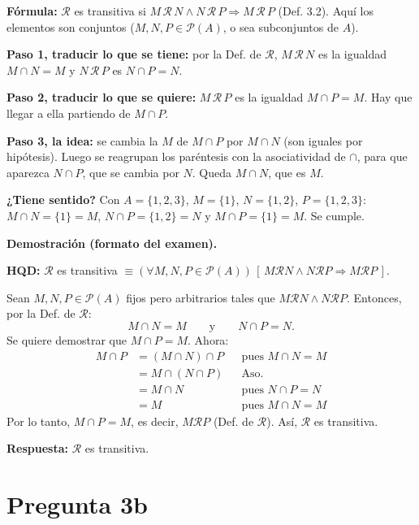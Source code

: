 \documentclass[11pt]{article}
\newcommand{\R}{\mathcal{R}}
\begin{document}

\begin{explica}
\textbf{Fórmula:} $\R$ es transitiva si $M\,\R\,N\wedge N\,\R\,P\Rightarrow M\,\R\,P$ (Def. 3.2). Aquí los elementos son conjuntos ($M,N,P\in\mathcal P(A)$, o sea subconjuntos de $A$).

\textbf{Paso 1, traducir lo que se tiene:} por la Def. de $\R$, $M\,\R\,N$ es la igualdad $M\cap N=M$ y $N\,\R\,P$ es $N\cap P=N$.

\textbf{Paso 2, traducir lo que se quiere:} $M\,\R\,P$ es la igualdad $M\cap P=M$. Hay que llegar a ella partiendo de $M\cap P$.

\textbf{Paso 3, la idea:} se cambia la $M$ de $M\cap P$ por $M\cap N$ (son iguales por hipótesis). Luego se reagrupan los paréntesis con la asociatividad de $\cap$, para que aparezca $N\cap P$, que se cambia por $N$. Queda $M\cap N$, que es $M$.

\textbf{¿Tiene sentido?} Con $A=\{1,2,3\}$, $M=\{1\}$, $N=\{1,2\}$, $P=\{1,2,3\}$: $M\cap N=\{1\}=M$, $N\cap P=\{1,2\}=N$ y $M\cap P=\{1\}=M$. Se cumple.
\end{explica}

\textbf{Demostración (formato del examen).}

\textbf{HQD:} $\R$ es transitiva $\equiv(\forall M,N,P\in\mathcal P(A))\,[\,M\R N\wedge N\R P\Rightarrow M\R P\,]$.

Sean $M,N,P\in\mathcal P(A)$ fijos pero arbitrarios tales que $M\R N\wedge N\R P$. Entonces, por la Def. de $\R$:
\[
M\cap N=M\qquad\text{y}\qquad N\cap P=N.
\]
Se quiere demostrar que $M\cap P=M$. Ahora:
\begin{align*}
M\cap P &= (M\cap N)\cap P && \text{pues } M\cap N=M\\
&= M\cap(N\cap P) && \text{Aso.}\\
&= M\cap N && \text{pues } N\cap P=N\\
&= M && \text{pues } M\cap N=M
\end{align*}
Por lo tanto, $M\cap P=M$, es decir, $M\R P$ (Def. de $\R$). Así, $\R$ es transitiva.

\textbf{Respuesta:} $\R$ es transitiva.

\clearpage
\section*{Pregunta 3b}
\end{document}
